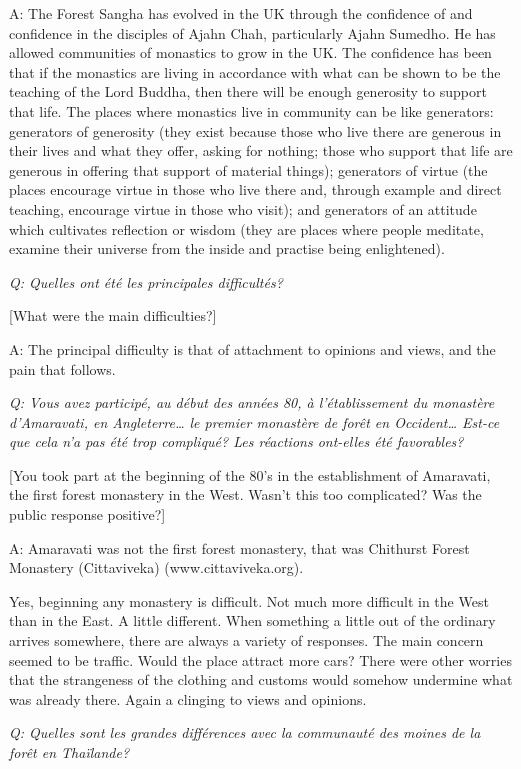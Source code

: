 A: The Forest Sangha has evolved in the UK through the confidence of and
confidence in the disciples of Ajahn Chah, particularly Ajahn Sumedho. 
He has allowed communities of monastics to grow in the UK. The
confidence has been that if the monastics are living in accordance with
what can be shown to be the teaching of the Lord Buddha, then there will
be enough generosity to support that life. The places where monastics
live in community can be like generators: generators of generosity (they
exist because those who live there are generous in their lives and what
they offer, asking for nothing; those who support that life are generous
in offering that support of material things); generators of virtue (the
places encourage virtue in those who live there and, through example and
direct teaching, encourage virtue in those who visit); and generators of
an attitude which cultivates reflection or wisdom (they are places where
people meditate, examine their universe from the inside and practise
being enlightened). 

\emph{Q: Quelles ont été les principales difficultés?}

{[}What were the main difficulties?{]}

A: The principal difficulty is that of attachment to opinions and views, 
and the pain that follows. 

\emph{Q: Vous avez participé, au début des années 80, à l'établissement
du monastère d'Amaravati, en Angleterre\ldots{} le premier monastère de
forêt en Occident\ldots{} Est-ce que cela n'a pas été trop compliqué?
Les réactions ont-elles été favorables?}

{[}You took part at the beginning of the 80's in the establishment of
Amaravati, the first forest monastery in the West. Wasn't this too
complicated? Was the public response positive?{]}

A: Amaravati was not the first forest monastery, that was Chithurst
Forest Monastery (Cittaviveka) (www.cittaviveka.org).

Yes, beginning any monastery is difficult. Not much more difficult in
the West than in the East. A little different. When something a little
out of the ordinary arrives somewhere, there are always a variety of
responses. The main concern seemed to be traffic. Would the place
attract more cars? There were other worries that the strangeness of the
clothing and customs would somehow undermine what was already there. 
Again a clinging to views and opinions. 

\emph{Q: Quelles sont les grandes différences avec la communauté des
moines de la forêt en Thaïlande?}

